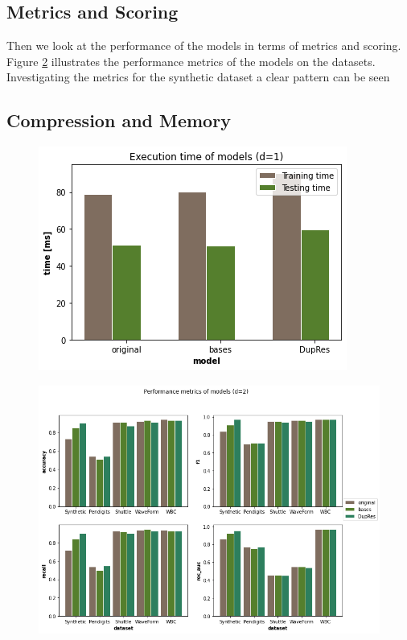 \subsection{Metrics and Scoring}
Then we look at the performance of the models in terms of metrics and scoring. Figure \ref{fig:performance_metrics} illustrates the performance metrics of the models on the datasets. Investigating the metrics for the synthetic dataset a clear pattern can be seen

\subsection{Compression and Memory}

\begin{figure}
  \centering
  \includegraphics[width=0.8\linewidth]{images/performance_time.png}
  \caption{}
  \label{fig:performance_time}
\end{figure}

\begin{figure}
  \centering
  \includegraphics[width=\linewidth]{images/performance_metrics.png}
  \caption{}
  \label{fig:performance_metrics}
\end{figure}



